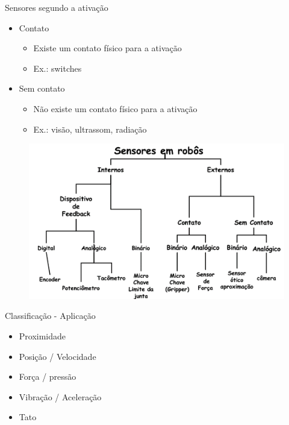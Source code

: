 \documentclass[aspectratio=169,
				xcolor=table]{beamer}
\begin{document}
		\begin{frame}{Sensores segundo a ativação}
			\begin{itemize}
					\item Contato
					\begin{itemize}
						\item Existe um contato físico para a ativação
						\item Ex.: switches				
					\end{itemize}
				\vspace{0.8cm}
					\item Sem contato
					\begin{itemize}
						\item Não existe um contato físico para a ativação
						\item Ex.: visão, ultrassom, radiação
					\end{itemize}
			\end{itemize}
		\end{frame}			
		
		\begin{frame}
			\begin{figure}
				\centering	
				\includegraphics[scale=.4]{../figs/cap03/Imagem29}
			\end{figure}	
		\end{frame}			
		
		\begin{frame}{Classificação - Aplicação}
			\begin{itemize}
				\item Proximidade
				\vspace{0.8cm}	
				\item Posição / Velocidade
				\vspace{0.8cm}	
				\item Força / pressão
				\vspace{0.8cm}	
				\item Vibração / Aceleração
				\vspace{0.8cm}	
				\item Tato
	
			\end{itemize}			
		
		\end{frame}
		
\end{document}
